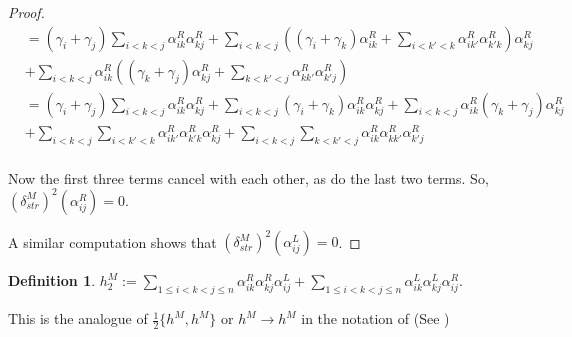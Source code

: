 \documentclass[a4paper,final, reqno]{amsart}
\theoremstyle{plain}
\theoremstyle{definition}
\newtheorem{Def}[Th]{Definition}
\begin{document}
\begin{proof}
		\begin{align*}
			&= (\gamma_i+\gamma_j) \sum_{i<k<j} \alpha_{ik}^R\alpha_{kj}^R + \sum_{i<k<j}  \left( (\gamma_i+\gamma_k)\alpha_{ik}^R + \sum_{i<k'<k} \alpha_{ik'}^R\alpha_{k'k}^R \right)\alpha_{kj}^R \\
			&+ \sum_{i<k<j}  \alpha_{ik}^R\left( (\gamma_k+\gamma_j)\alpha_{kj}^R + \sum_{k<k'<j} \alpha_{kk'}^R\alpha_{k'j}^R \right) \\
			&= (\gamma_i+\gamma_j) \sum_{i<k<j} \alpha_{ik}^R\alpha_{kj}^R + \sum_{i<k<j} (\gamma_i+\gamma_k)\alpha_{ik}^R\alpha_{kj}^R + \sum_{i<k<j}  \alpha_{ik}^R (\gamma_k+\gamma_j)\alpha_{kj}^R   \\
			&+ \sum_{i<k<j} \sum_{i<k'<k} \alpha_{ik'}^R\alpha_{k'k}^R \alpha_{kj}^R  + \sum_{i<k<j}\sum_{k<k'<j} \alpha_{ik}^R \alpha_{kk'}^R\alpha_{k'j}^R  \\
		\end{align*}
		
		Now the first three terms cancel with each other, as do the last two terms. So, $(\delta_{str}^M)^2(\alpha_{ij}^R) = 0$.
		
		A similar computation shows that $(\delta_{str}^M)^2(\alpha_{ij}^L) = 0$.
		
		
	\end{proof}
	
	
	\begin{Def}
		$h^M_2:= \sum_{1\leq i<k<j\leq n} \alpha_{ik}^R\alpha_{kj}^R\alpha_{ij}^L + \sum_{1\leq i<k<j\leq n} \alpha_{ik}^L\alpha_{kj}^L\alpha_{ij}^R$.
	\end{Def}
	This is the analogue of $\frac{1}{2}\{h^M, h^M\}$ or $h^M\to h^M$ in the notation of \cite{ng} (See )
	
\end{document}
